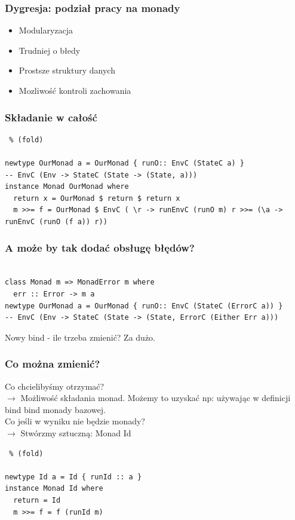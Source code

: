 \documentclass{beamer}
\begin{document}
\begin{frame}[fragile] %
  \frametitle{Dygresja: podział pracy na monady}
  \begin{itemize}
    \item Modularyzacja
    \item Trudniej o błedy
    \item Prostsze struktury danych
    \item Mozliwość kontroli zachowania
  \end{itemize}
\end{frame}

\begin{frame}[fragile] %
  \frametitle{Składanie w całość}
\begin{lstlisting} % (fold)

newtype OurMonad a = OurMonad { runO:: EnvC (StateC a) }
-- EnvC (Env -> StateC (State -> (State, a)))
instance Monad OurMonad where
  return x = OurMonad $ return $ return x
  m >>= f = OurMonad $ EnvC ( \r -> runEnvC (runO m) r >>= (\a -> runEnvC (runO (f a)) r))

\end{lstlisting}
\end{frame}

\begin{frame}[fragile] %
  \frametitle{A może by tak dodać obsługę błędów?}
\begin{lstlisting}

class Monad m => MonadError m where
  err :: Error -> m a
newtype OurMonad a = OurMonad { runO:: EnvC (StateC (ErrorC a)) }
-- EnvC (Env -> StateC (State -> (State, ErrorC (Either Err a)))

\end{lstlisting}
Nowy bind - ile trzeba zmienić?
Za dużo.
\end{frame}

\begin{frame}[fragile] %
  \frametitle{Co można zmienić?}
  Co chcielibyśmy otrzymać?\\
  $\rightarrow$ Możliwość składania monad. Możemy to uzyskać np: używając w definicji bind bind monady bazowej. \\
  Co jeśli w wyniku nie będzie monady?\\
  $\rightarrow$ Stwórzmy sztuczną: Monad Id
  \begin{lstlisting} % (fold)

newtype Id a = Id { runId :: a }
instance Monad Id where
  return = Id
  m >>= f = f (runId m)

  \end{lstlisting}
\end{frame}
\end{document}
